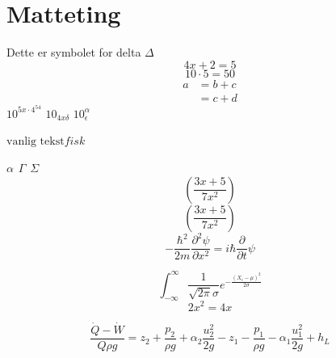 \section{Matteting}

Dette er symbolet for delta $\Delta$
\begin{equation}
    4x + 2 = 5
    \label{eq:matteting test}
\end{equation}
\begin{equation}
    10 \cdot 5 = 50
    \label{eq:10x5}
\end{equation}
\begin{equation}
    \begin{split}
        a &= b + c \\
        &= c + d %
    \end{split}
    \label{eq:flere likninger}
\end{equation}
$10^{5x\cdot4^{54}}$ %
$10_{4x\delta}$
$10^{\alpha}_{\epsilon}$

$\text{vanlig tekst} fisk$

$\alpha \hspace{5pt}\Gamma\hspace{5pt} \Sigma$
\begin{equation}
    (\frac{3x+5}{7x^{2}})
\end{equation}
\begin{equation}
    \left(\frac{3x+5}{7x^{2}}\right)
\end{equation}
\begin{equation}
    -\frac{\hbar^2}{2m} \frac{\partial^2\psi}{\partial x^2} =
    i \hbar \frac{\partial}{\partial t} \psi
    \label{eq:schrodinger} %
\end{equation}

\begin{equation}
    \int_{-\infty}^{\infty} \frac{1}{\sqrt{2\pi}\sigma}
    e^{-\frac{(X_i-\mu)^2}{2\sigma}}
    \label{eq:standard normalfordeling}
\end{equation}
\begin{equation*}
    2x^2 = 4x
    \label{eq:uten nummer}
\end{equation*}


\begin{equation}
    \frac{\dot{Q} - \dot{W}}{Q \rho g} = z_2 + \frac{p_2}{\rho g} + \alpha_2 \frac{u_2^2}{2g} - z_1 - \frac{p_1}{\rho g} - \alpha_1 \frac{u_1^2}{2g} + h_L
\end{equation}